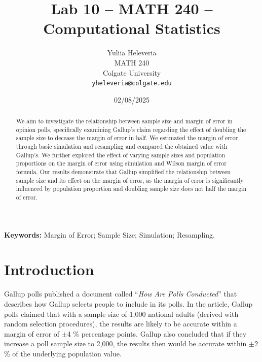 \documentclass{article}\usepackage[]{graphicx}\usepackage[]{xcolor}
\begin{document}
\vspace{-1in}
\title{Lab 10 -- MATH 240 -- Computational Statistics}

\author{
  Yuliia Heleveria \\
  MATH 240  \\
  Colgate University  \\
  {\tt yheleveria@colgate.edu}
}

\date{02/08/2025}

\maketitle

\begin{multicols}{2}
\raggedcolumns %
\begin{abstract}
We aim to investigate the relationship between sample size and margin of error in opinion polls, specifically examining Gallup's claim regarding the effect of doubling the sample size to decease the margin of error in half. We estimated the margin of error through basic simulation and resampling and compared the obtained value with Gallup's. We further explored the effect of varying sample sizes and population proportions on the margin of error using simulation and Wilson margin of error formula. Our results demonstrate that Gallup simplified the relationship between sample size and its effect on the margin of error, as the margin of error is significantly influenced by population proportion and doubling sample size does not half the margin of error.
\end{abstract}

\noindent \textbf{Keywords:} Margin of Error; Sample Size; Simulation; Resampling.

\section{Introduction} 

Gallup polls published a document called ``\textit{How Are Polls Conducted}'' that describes how Gallup selects people to include in its polls. In the article, Gallup polls claimed that with a sample size of 1,000 national adults (derived with random selection procedures), the results are likely to be accurate within a margin of error of  $\pm$4 \% percentage points. Gallup also concluded that if they increase a poll sample size to 2,000, the results then would be accurate within $\pm$2 \% of the underlying population value. 


\end{multicols}
\end{document}
